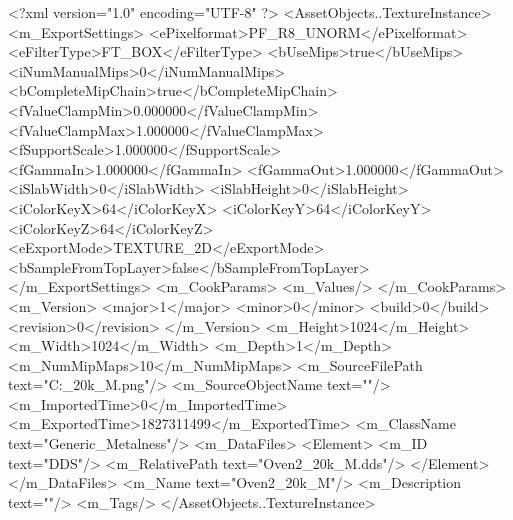 <?xml version="1.0" encoding="UTF-8" ?>
<AssetObjects..TextureInstance>
	<m_ExportSettings>
		<ePixelformat>PF_R8_UNORM</ePixelformat>
		<eFilterType>FT_BOX</eFilterType>
		<bUseMips>true</bUseMips>
		<iNumManualMips>0</iNumManualMips>
		<bCompleteMipChain>true</bCompleteMipChain>
		<fValueClampMin>0.000000</fValueClampMin>
		<fValueClampMax>1.000000</fValueClampMax>
		<fSupportScale>1.000000</fSupportScale>
		<fGammaIn>1.000000</fGammaIn>
		<fGammaOut>1.000000</fGammaOut>
		<iSlabWidth>0</iSlabWidth>
		<iSlabHeight>0</iSlabHeight>
		<iColorKeyX>64</iColorKeyX>
		<iColorKeyY>64</iColorKeyY>
		<iColorKeyZ>64</iColorKeyZ>
		<eExportMode>TEXTURE_2D</eExportMode>
		<bSampleFromTopLayer>false</bSampleFromTopLayer>
	</m_ExportSettings>
	<m_CookParams>
		<m_Values/>
	</m_CookParams>
	<m_Version>
		<major>1</major>
		<minor>0</minor>
		<build>0</build>
		<revision>0</revision>
	</m_Version>
	<m_Height>1024</m_Height>
	<m_Width>1024</m_Width>
	<m_Depth>1</m_Depth>
	<m_NumMipMaps>10</m_NumMipMaps>
	<m_SourceFilePath text="C:\Users\Shadow\Desktop\Prototypes{}_20k_M.png"/>
	<m_SourceObjectName text=""/>
	<m_ImportedTime>0</m_ImportedTime>
	<m_ExportedTime>1827311499</m_ExportedTime>
	<m_ClassName text="Generic_Metalness"/>
	<m_DataFiles>
		<Element>
			<m_ID text="DDS"/>
			<m_RelativePath text="Oven2_20k_M.dds"/>
		</Element>
	</m_DataFiles>
	<m_Name text="Oven2_20k_M"/>
	<m_Description text=""/>
	<m_Tags/>
</AssetObjects..TextureInstance>

